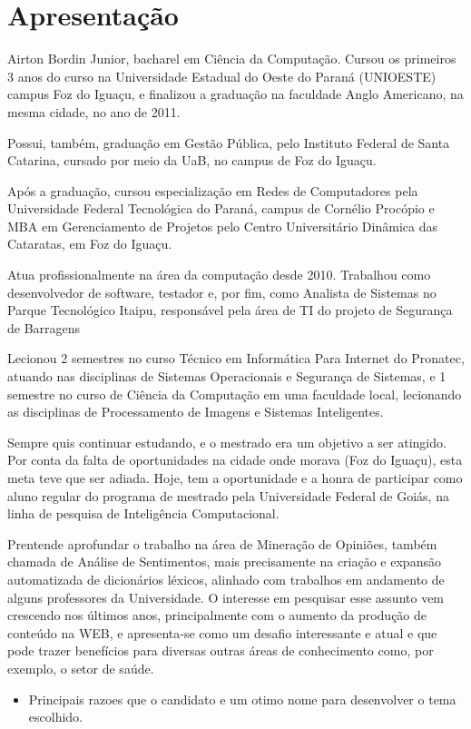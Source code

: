\documentclass[a4paper,11pt]{article}
\begin{document}
\section{Apresentação}
Airton Bordin Junior, bacharel em Ciência da Computação. Cursou os primeiros 3 anos do curso na Universidade Estadual do Oeste do Paraná (UNIOESTE) campus Foz do Iguaçu, e finalizou a graduação na faculdade Anglo Americano, na mesma cidade, no ano de 2011.

Possui, também, graduação em Gestão Pública, pelo Instituto Federal de Santa Catarina, cursado por meio da UaB, no campus de Foz do Iguaçu.

Após a graduação, cursou especialização em Redes de Computadores pela Universidade Federal Tecnológica do Paraná, campus de Cornélio Procópio e MBA em Gerenciamento de Projetos pelo Centro Universitário Dinâmica das Cataratas, em Foz do Iguaçu.

Atua profissionalmente na área da computação desde 2010. Trabalhou como desenvolvedor de software, testador e, por fim, como Analista de Sistemas no Parque Tecnológico Itaipu, responsável pela área de TI do projeto de Segurança de Barragens

Lecionou 2 semestres no curso Técnico em Informática Para Internet do Pronatec, atuando nas disciplinas de Sistemas Operacionais e Segurança de Sistemas, e 1 semestre no curso de Ciência da Computação em uma faculdade local, lecionando as disciplinas de Processamento de Imagens e Sistemas Inteligentes.

Sempre quis continuar estudando, e o mestrado era um objetivo a ser atingido. Por conta da falta de oportunidades na cidade onde morava (Foz do Iguaçu), esta meta teve que ser adiada. Hoje, tem a oportunidade e a honra de participar como aluno regular do programa de mestrado pela Universidade Federal de Goiás, na linha de pesquisa de Inteligência Computacional.

Prentende aprofundar o trabalho na área de Mineração de Opiniões, também chamada de Análise de Sentimentos, mais precisamente na criação e expansão automatizada de dicionários léxicos, alinhado com trabalhos em andamento de alguns professores da Universidade. O interesse em pesquisar esse assunto vem crescendo nos últimos anos, principalmente com o aumento da produção de conteúdo na WEB, e apresenta-se como um desafio interessante e atual e que pode trazer benefícios para diversas outras áreas de conhecimento como, por exemplo, o setor de saúde.

\begin{itemize}
\item{Principais razoes que o candidato e um otimo nome para desenvolver o tema escolhido.}
\end{itemize}
\end{document}
